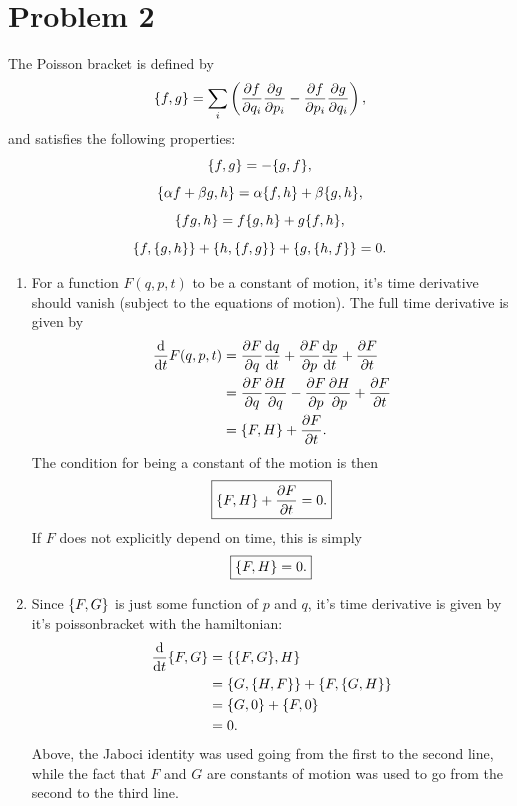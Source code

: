 \documentclass[12pt]{article}
\begin{document}
\section*{Problem 2}
The Poisson bracket is defined by
\[ \poissonbracket{f}{g} = \sum_i \left(\pdv{f}{q_i}\pdv{g}{p_i} - \pdv{f}{p_i}\pdv{g}{q_i}\right), \]
and satisfies the following properties:
\[ \poissonbracket{f}{g} = -\poissonbracket{g}{f}, \]
\[ \poissonbracket{\alpha f + \beta g}{h} = \alpha\poissonbracket{f}{h} + \beta\poissonbracket{g}{h}, \]
\[ \poissonbracket{fg}{h} = f\poissonbracket{g}{h} + g\poissonbracket{f}{h}, \]
\[ \poissonbracket{f}{\poissonbracket{g}{h}} + \poissonbracket{h}{\poissonbracket{f}{g}} + \poissonbracket{g}{\poissonbracket{h}{f}} = 0.  \]
\begin{enumerate}[label=\roman*.]
    \item For a function $F(q,p,t)$ to be a constant of motion, it's time derivative should vanish (subject to the equations of motion). The full time derivative is given by
    \begin{align*}
        \dv{t}F(q,p,t) &= \pdv{F}{q}\dv{q}{t} + \pdv{F}{p}\dv{p}{t} + \pdv{F}{t} \\
        &= \pdv{F}{q}\pdv{H}{q} - \pdv{F}{p}\pdv{H}{p} + \pdv{F}{t} \\
        &= \poissonbracket{F}{H} + \pdv{F}{t}.
    \end{align*}
    The condition for being a constant of the motion is then
    \[ \boxed{\poissonbracket{F}{H} + \pdv{F}{t} = 0.} \]
    If $F$ does not explicitly depend on time, this is simply
    \[ \boxed{\poissonbracket{F}{H} = 0.} \]

    \item Since $\poissonbracket{F}{G}$ is just some function of $p$ and $q$, it's time derivative is given by it's poissonbracket with the hamiltonian:
    \begin{align*}
        \dv{t}\poissonbracket{F}{G} &= \poissonbracket{\poissonbracket{F}{G}}{H} \\
        &= \poissonbracket{G}{\poissonbracket{H}{F}} + \poissonbracket{F}{\poissonbracket{G}{H}} \\
        &= \poissonbracket{G}{0} + \poissonbracket{F}{0} \\
        &= 0.
    \end{align*}
    Above, the Jaboci identity was used going from the first to the second line, while the fact that $F$ and $G$ are constants of motion was used to go from the second to the third line.


\end{enumerate}
\end{document}
